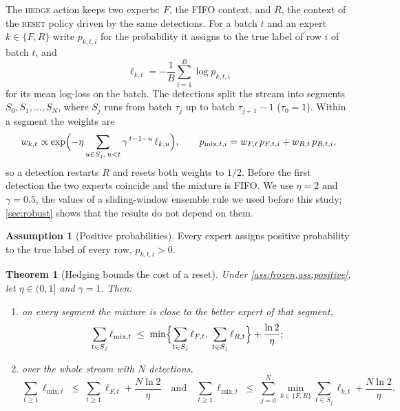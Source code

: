 \documentclass[10pt]{article}
\newtheorem{theorem}{Theorem}
\theoremstyle{definition}
\newtheorem{assumption}{Assumption}
\theoremstyle{remark}
\newcommand{\full}{\textup{\textsc{reset}}}
\newcommand{\hedge}{\textup{\textsc{hedge}}}
\begin{document}
The \hedge{} action keeps two experts: $F$, the FIFO context, and $R$, the context of the \full{} policy driven by the
same detections. For a batch $t$ and an expert $k\in\{F,R\}$ write $p_{k,t,i}$ for the probability it assigns to the
true label of row $i$ of batch $t$, and
\begin{equation}
  \ell_{k,t}=-\frac1B\sum_{i=1}^{B}\log p_{k,t,i}
\end{equation}
for its mean log-loss on the batch. The detections split the stream into segments $S_0,S_1,\dots,S_N$, where $S_j$
runs from batch $\tau_j$ up to batch $\tau_{j+1}-1$ ($\tau_0=1$). Within a segment the weights are
\begin{equation}
  w_{k,t}\propto\exp\Bigl(-\eta\sum_{u\in S_j,\,u<t}\gamma^{\,t-1-u}\,\ell_{k,u}\Bigr),
  \qquad p_{\mathrm{mix},t,i}=w_{F,t}\,p_{F,t,i}+w_{R,t}\,p_{R,t,i},
\end{equation}
so a detection restarts $R$ and resets both weights to $1/2$. Before the first detection the two experts coincide and
the mixture is FIFO. We use $\eta=2$ and $\gamma=0.5$, the values of a sliding-window ensemble rule we used before
this study; \cref{sec:robust} shows that the results do not depend on them.

\begin{assumption}[Positive probabilities]
\label{ass:positive}
Every expert assigns positive probability to the true label of every row, $p_{k,t,i}>0$.
\end{assumption}

\begin{theorem}[Hedging bounds the cost of a reset]
\label{thm:hedge}
Under \cref{ass:frozen,ass:positive}, let $\eta\in(0,1]$ and $\gamma=1$. Then:
\begin{enumerate}\renewcommand{\theenumi}{\roman{enumi}}\renewcommand{\labelenumi}{(\theenumi)}
\item on every segment the mixture is close to the better expert of that segment,
  \begin{equation}
    \sum_{t\in S_j}\ell_{\mathrm{mix},t}\;\le\;\min\Bigl\{\sum_{t\in S_j}\ell_{F,t},\;\sum_{t\in S_j}\ell_{R,t}\Bigr\}
    +\frac{\ln 2}{\eta};
  \end{equation}
\item over the whole stream with $N$ detections,
  \begin{equation}
    \sum_{t\ge1}\ell_{\mathrm{mix},t}\;\le\;\sum_{t\ge1}\ell_{F,t}+\frac{N\ln 2}{\eta}
    \quad\text{and}\quad
    \sum_{t\ge1}\ell_{\mathrm{mix},t}\;\le\;\sum_{j=0}^{N}\min_{k\in\{F,R\}}\sum_{t\in S_j}\ell_{k,t}+\frac{N\ln 2}{\eta}.
  \end{equation}
\end{enumerate}
\end{theorem}
\end{document}
